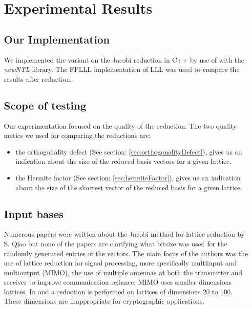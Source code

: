 \documentclass[10pt, a4paper]{article}
\newcommand{\my}[1]{{\color{blue} #1 }}
\begin{document}
\section{Experimental Results}

\subsection{Our Implementation}

We implemented the \my{variant on the} Jacobi reduction in C++ \my{by use of} with the \emph{newNTL} library. The FPLLL implementation \my{of LLL} was used \my{to compare the results after reduction.}

\subsection{Scope of testing}

Our experimentation focused on the quality of the reduction. The two quality \my{metics} we used for comparing the reductions are:

\begin{itemize}
\item the orthogonality defect (See section: \ref{sec:orthogonalityDefect}), gives us an indication about the size of the reduced basis vectors for a given lattice.
\item the Hermite factor (See section: \ref{sec:hermiteFactor}), gives us an indication about the size of the shortest vector of the reduced basis for a given lattice.
\end{itemize}

\subsection{Input bases}
Numerous papers were written about the Jacobi method for lattice reduction by S. Qiao \cite{originalJacobiMethodLatticeBasisReduction}\cite{complexityAnalysisOfJacobiMethod}\cite{enhancedJacobi} but none of the papers are clarifying what bitsize was used for the randomly generated entries of the vectors. The main focus of the authors was the use of lattice reduction for signal processing, more specifically multiinput and multioutput (MIMO), the use of multiple antennas at both the transmitter and receiver to improve communication reliance. MIMO uses smaller dimensions lattices. \my{In} \cite{enhancedJacobi} and \cite{tian2014hybrid} \my{a reduction is performed on} lattices of dimensions 20 to 100. These dimensions are inappropriate for cryptographic applications.
\end{document}
